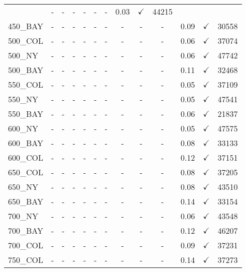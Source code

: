 \documentclass[main.tex]{subfiles}
\begin{document}
\begin{landscape}
\begin{center}
\begin{tabular}{lcccccccccccc}
 & - & - & - 
 & - & - & - 
 & 0.03 & $\checkmark$ & 44215\\
450\_BAY & - & - & - 
 & - & - & - 
 & - & - & - 
 & 0.09 & $\checkmark$ & 30558\\
500\_COL & - & - & - 
 & - & - & - 
 & - & - & - 
 & 0.06 & $\checkmark$ & 37074\\
500\_NY & - & - & - 
 & - & - & - 
 & - & - & - 
 & 0.06 & $\checkmark$ & 47742\\
500\_BAY & - & - & - 
 & - & - & - 
 & - & - & - 
 & 0.11 & $\checkmark$ & 32468\\
550\_COL & - & - & - 
 & - & - & - 
 & - & - & - 
 & 0.05 & $\checkmark$ & 37109\\
550\_NY & - & - & - 
 & - & - & - 
 & - & - & - 
 & 0.05 & $\checkmark$ & 47541\\
550\_BAY & - & - & - 
 & - & - & - 
 & - & - & - 
 & 0.06 & $\checkmark$ & 21837\\
600\_NY & - & - & - 
 & - & - & - 
 & - & - & - 
 & 0.05 & $\checkmark$ & 47575\\
600\_BAY & - & - & - 
 & - & - & - 
 & - & - & - 
 & 0.08 & $\checkmark$ & 33133\\
600\_COL & - & - & - 
 & - & - & - 
 & - & - & - 
 & 0.12 & $\checkmark$ & 37151\\
650\_COL & - & - & - 
 & - & - & - 
 & - & - & - 
 & 0.08 & $\checkmark$ & 37205\\
650\_NY & - & - & - 
 & - & - & - 
 & - & - & - 
 & 0.08 & $\checkmark$ & 43510\\
650\_BAY & - & - & - 
 & - & - & - 
 & - & - & - 
 & 0.14 & $\checkmark$ & 33154\\
700\_NY & - & - & - 
 & - & - & - 
 & - & - & - 
 & 0.06 & $\checkmark$ & 43548\\
700\_BAY & - & - & - 
 & - & - & - 
 & - & - & - 
 & 0.12 & $\checkmark$ & 46207\\
700\_COL & - & - & - 
 & - & - & - 
 & - & - & - 
 & 0.09 & $\checkmark$ & 37231\\
750\_COL & - & - & - 
 & - & - & - 
 & - & - & - 
 & 0.14 & $\checkmark$ & 37273\\
\hline\end{tabular}
\end{center}
\end{landscape}
\newpage
\end{document}
